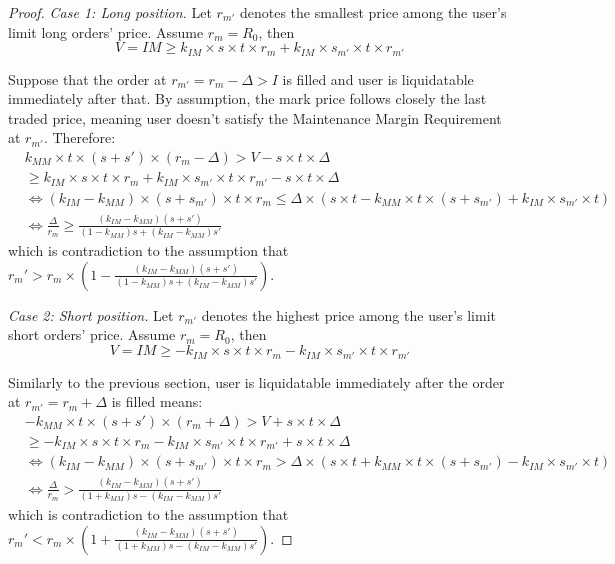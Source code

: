 \documentclass[notitlepage,reqno,11pt]{amsart}
\numberwithin{equation}{section}
\begin{document}
\begin{proof} 
    \textit{Case 1: Long position.} Let $r_{m'}$ denotes the smallest price among the user's limit long orders' price. Assume $r_m = R_0$, then
    $$
    V =  IM\geq k_{IM}\times s\times t\times r_m + k_{IM}\times s_{m'}\times t\times r_{m'}
    $$ 

    Suppose that the order at $r_{m'} = r_m - \Delta > I$ is filled and user is liquidatable immediately after that. By assumption, the mark price follows closely the last traded price, meaning user doesn't satisfy the Maintenance Margin Requirement at $r_{m'}$. Therefore:
    \begin{align*} 
         &k_{MM}\times t\times (s+s')\times (r_m-\Delta)> V - s\times t\times\Delta\\
         &\geq k_{IM}\times s\times t\times r_m + k_{IM}\times s_{m'}\times t\times r_{m'} - s\times t\times\Delta\\
        &\iff (k_{IM}-k_{MM})\times(s + s_{m'})\times t\times r_m \leq \Delta\times(s\times t - k_{MM}\times t \times (s + s_{m'}) + k_{IM}\times s_{m'}\times t)\\
        &\iff \frac{\Delta}{r_m} \geq \frac{(k_{IM} - k_{MM})(s+s')}{(1-k_{MM})s + (k_{IM} - k_{MM})s'}
    \end{align*}
    which is contradiction to the assumption that $r_m' > r_m\times (1-\frac{(k_{IM} - k_{MM})(s+s')}{(1-k_{MM})s + (k_{IM} - k_{MM})s'})$.

    \textit{Case 2: Short position.} Let $r_{m'}$ denotes the highest price among the user's limit short orders' price. Assume $r_m = R_0$, then
    $$
    V =  IM\geq -k_{IM}\times s\times t\times r_m - k_{IM}\times s_{m'}\times t\times r_{m'}
    $$ 

    Similarly to the previous section, user is liquidatable immediately after the order at $r_{m'} = r_m + \Delta$ is filled means:
    \begin{align*} 
         &-k_{MM}\times t\times (s+s')\times (r_m+\Delta)> V + s\times t\times\Delta\\
         &\geq -k_{IM}\times s\times t\times r_m -k_{IM}\times s_{m'}\times t\times r_{m'} + s\times t\times\Delta\\
        &\iff (k_{IM}-k_{MM})\times(s + s_{m'})\times t\times r_m > \Delta\times(s\times t + k_{MM}\times t \times (s + s_{m'}) - k_{IM}\times s_{m'}\times t)\\
        &\iff \frac{\Delta}{r_m} > \frac{(k_{IM} - k_{MM})(s+s')}{(1+k_{MM})s - (k_{IM} - k_{MM})s'}
    \end{align*}
    which is contradiction to the assumption that $r_m' < r_m\times (1+\frac{(k_{IM} - k_{MM})(s+s')}{(1+k_{MM})s - (k_{IM} - k_{MM})s'})$.
\end{proof}
\end{document}
